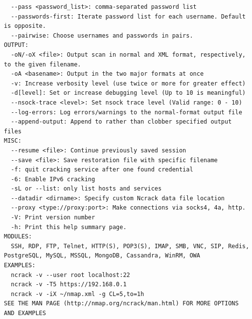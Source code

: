 \documentclass{article}
\begin{document}
\begin{lstlisting}
  --pass <password_list>: comma-separated password list
  --passwords-first: Iterate password list for each username. Default is opposite.
  --pairwise: Choose usernames and passwords in pairs.
OUTPUT:
  -oN/-oX <file>: Output scan in normal and XML format, respectively, to the given filename.
  -oA <basename>: Output in the two major formats at once
  -v: Increase verbosity level (use twice or more for greater effect)
  -d[level]: Set or increase debugging level (Up to 10 is meaningful)
  --nsock-trace <level>: Set nsock trace level (Valid range: 0 - 10)
  --log-errors: Log errors/warnings to the normal-format output file
  --append-output: Append to rather than clobber specified output files
MISC:
  --resume <file>: Continue previously saved session
  --save <file>: Save restoration file with specific filename
  -f: quit cracking service after one found credential
  -6: Enable IPv6 cracking
  -sL or --list: only list hosts and services
  --datadir <dirname>: Specify custom Ncrack data file location
  --proxy <type://proxy:port>: Make connections via socks4, 4a, http.
  -V: Print version number
  -h: Print this help summary page.
MODULES:
  SSH, RDP, FTP, Telnet, HTTP(S), POP3(S), IMAP, SMB, VNC, SIP, Redis, PostgreSQL, MySQL, MSSQL, MongoDB, Cassandra, WinRM, OWA
EXAMPLES:
  ncrack -v --user root localhost:22
  ncrack -v -T5 https://192.168.0.1
  ncrack -v -iX ~/nmap.xml -g CL=5,to=1h
SEE THE MAN PAGE (http://nmap.org/ncrack/man.html) FOR MORE OPTIONS AND EXAMPLES
\end{lstlisting}
\end{document}
